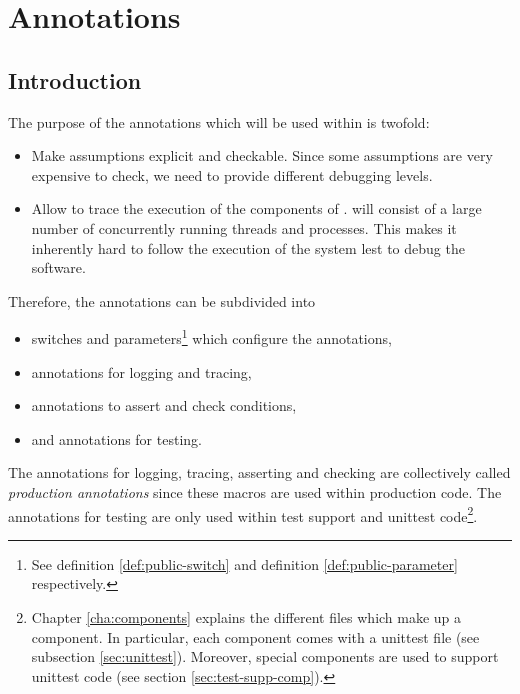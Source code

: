 %

\chapter{Annotations}
\label{cha:annotations}


\section{Introduction}
\label{sec:introduction}

The purpose of the annotations which will be used within \SYNEIGHT is
twofold:
\begin{itemize}
\item Make assumptions explicit and checkable. Since some assumptions
  are very expensive to check, we need to provide different debugging
  levels. 
\item Allow to trace the execution of the components of \SYNEIGHT.
  \SYNEIGHT will consist of a large number of concurrently running
  threads and processes. This makes it inherently hard to follow the
  execution of the system lest to debug the software.
\end{itemize}
%
Therefore, the annotations can be subdivided into 
\begin{itemize}
\item switches and parameters\footnote{See definition
    \vref{def:public-switch} and definition \vref{def:public-parameter}
    respectively.} which configure the annotations,
\item annotations for logging and tracing,
\item annotations to assert and
  check conditions,
\item and annotations for testing.
\end{itemize}
%
The annotations for logging, tracing, asserting and checking are
collectively called \emph{production annotations} since these macros are used
within production code. The annotations for testing are only used
within test support and unittest code\footnote{Chapter
  \vref{cha:components} explains the different files which make up a
  component. In particular, each component comes with a unittest file
  (see subsection \vref{sec:unittest}). Moreover, special components are
  used to support unittest code (see section \vref{sec:test-supp-comp}).}.



